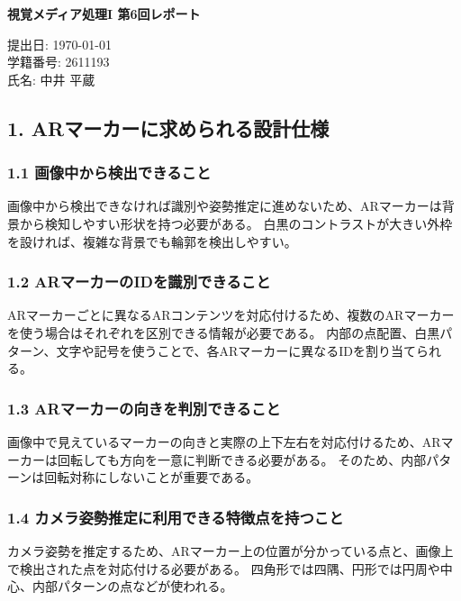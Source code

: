 \documentclass[11pt,a4paper]{ltjsarticle}
\begin{document}
\begin{center}
{\LARGE \textbf{視覚メディア処理I 第6回レポート}}
\end{center}
\vspace{1em}

\begin{flushright}
提出日: \today \\
学籍番号: 2611193 \\
氏名: 中井 平蔵
\end{flushright}

\subsection*{1. ARマーカーに求められる設計仕様}

\subsubsection*{1.1 画像中から検出できること}

画像中から検出できなければ識別や姿勢推定に進めないため、ARマーカーは背景から検知しやすい形状を持つ必要がある。
白黒のコントラストが大きい外枠を設ければ、複雑な背景でも輪郭を検出しやすい。

\subsubsection*{1.2 ARマーカーのIDを識別できること}

ARマーカーごとに異なるARコンテンツを対応付けるため、複数のARマーカーを使う場合はそれぞれを区別できる情報が必要である。
内部の点配置、白黒パターン、文字や記号を使うことで、各ARマーカーに異なるIDを割り当てられる。

\subsubsection*{1.3 ARマーカーの向きを判別できること}

画像中で見えているマーカーの向きと実際の上下左右を対応付けるため、ARマーカーは回転しても方向を一意に判断できる必要がある。
そのため、内部パターンは回転対称にしないことが重要である。

\subsubsection*{1.4 カメラ姿勢推定に利用できる特徴点を持つこと}

カメラ姿勢を推定するため、ARマーカー上の位置が分かっている点と、画像上で検出された点を対応付ける必要がある。
四角形では四隅、円形では円周や中心、内部パターンの点などが使われる。
\end{document}
